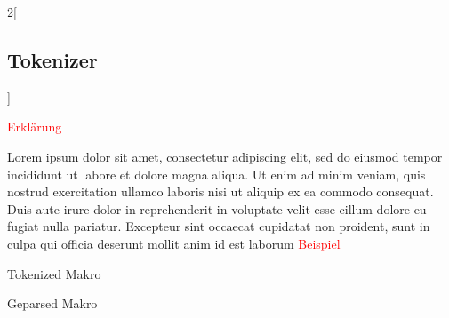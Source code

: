   \begin{paracol}{2}[\subsection{Tokenizer}]
    \label{ssec:Tokenizer}

      \textcolor{red}{Erklärung}

      Lorem ipsum dolor sit amet, consectetur adipiscing elit, sed do eiusmod tempor incididunt ut labore et dolore magna aliqua. Ut enim ad minim veniam, quis nostrud exercitation ullamco laboris nisi ut aliquip ex ea commodo consequat. Duis aute irure dolor in reprehenderit in voluptate velit esse cillum dolore eu fugiat nulla pariatur. Excepteur sint occaecat cupidatat non proident, sunt in culpa qui officia deserunt mollit anim id est laborum
    \switchcolumn
      \textcolor{red}{Beispiel}

      \begin{myCodeEnv}
        
        \caption{Tokenized Makro}
        \label{fig:ex_tok}
      \end{myCodeEnv}


    \label{ssec:Parser}

    \switchcolumn

      \begin{myCodeEnv}
        
        \caption{Geparsed Makro}
        \label{fig:ex_ast}
      \end{myCodeEnv}


    \label{ssec:Interpreter}
    \switchcolumn

  \end{paracol}

